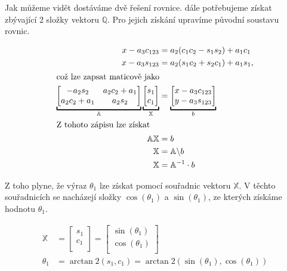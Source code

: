 \documentclass{article}
\begin{document}
				\noindent Jak můžeme vidět dostáváme dvě řešení rovnice. dále potřebujeme získat zbývající 2 složky vektoru \(\mathbb{Q}\). 
				Pro jejich získání upravíme původní soustavu rovnic.
				
					\begin{align}
						x-a_3c_{123} &= a_2(c_1c_2-s_1s_2)+a_1c_1 \nonumber \\
						x-a_3s_{123} &= a_2(s_1c_2+s_2c_1)+a_1s_1, \label{eq:igm:soust_upr_2} \\
						\intertext{což lze zapsat maticově jako}
						\underbracket{\begin{bmatrix}
								-a_2s_2 & a_2c_2+a_1 \\
								a_2c_2+a_1 & a_2s_2 \\
						\end{bmatrix}}_{\mathbb{A}} 
						\underbracket{\begin{bmatrix}
								s_1 \\
								c_1 \\
						\end{bmatrix}}_{\mathbb{X}} &= \underbracket{\begin{bmatrix}
								x-a_3c_{123} \\
								y-a_3s_{123} \\
						\end{bmatrix}}_{b} \label{eq:igm:soust_mat} \\
						\intertext{Z tohoto zápisu lze získat}
						\mathbb{A}\mathbb{X} &= b \nonumber \\
						\mathbb{X} &= \mathbb{A} \backslash b \nonumber \\
						\mathbb{X} &= \mathbb{A}^{-1} \cdot b
					\end{align}
				
				\noindent Z toho plyne, že výraz \(\theta_1\) lze získat pomocí souřadnic
				vektoru \(\mathbb{X}\). V těchto souřadnicích se nacházejí složky \(\cos(\theta_1)\) a \(\sin(\theta_1)\), ze
				kterých získáme hodnotu \(\theta_1\). 
				
					\begin{align}
						\mathbb{X} &= \begin{bmatrix}
						 s_1 \\
							 c_1 \\
						\end{bmatrix} = \begin{bmatrix}
							\sin(\theta_1) \\
							\cos(\theta_1) \\
						\end{bmatrix} \label{eq:igm:s1c1} \\
						\theta_1 &= \arctan2({s_1}, {c_1}) = \arctan2(\sin(\theta_1), \cos(\theta_1)) 		\label{eq:igm:theta_1_final}
					\end{align}
				
\end{document}
